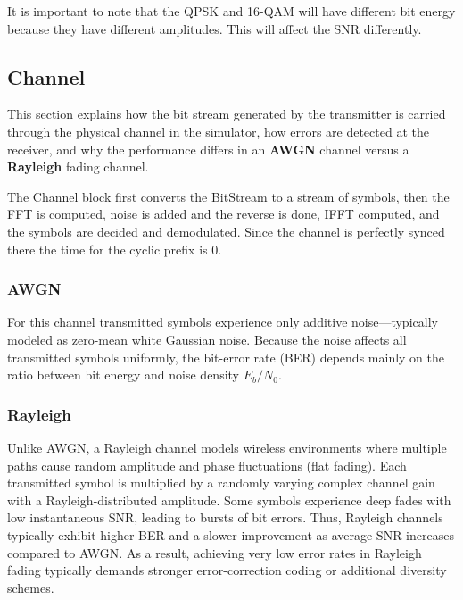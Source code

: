 It is important to note that the QPSK and 16-QAM will have different bit energy because they have different amplitudes. This will affect the SNR differently.


\subsection{Channel}

\label{sec:channel}

This section explains how the bit stream generated by the transmitter is carried through the physical channel in the simulator, how errors are detected at the receiver, and why the performance differs in an \textbf{AWGN} channel versus a \textbf{Rayleigh} fading channel.

The Channel block first converts the BitStream to a stream of symbols, then the FFT is computed, noise is added and the reverse is done, IFFT computed, and the symbols are decided and demodulated. Since the channel is perfectly synced there the time for the cyclic prefix is 0.

\subsubsection{AWGN}

For this channel transmitted symbols experience only additive noise—typically modeled as zero-mean white Gaussian noise. Because the noise affects all transmitted symbols uniformly, the bit-error rate (BER) depends mainly on the ratio between bit energy and noise density $E_b/N_{0}$. 

\subsubsection{Rayleigh}

Unlike AWGN, a Rayleigh channel models wireless environments where multiple paths cause random amplitude and phase fluctuations (flat fading). Each transmitted symbol is multiplied by a randomly varying complex channel gain with a Rayleigh-distributed amplitude. Some symbols experience deep fades with low instantaneous SNR, leading to bursts of bit errors. Thus, Rayleigh channels typically exhibit higher BER and a slower improvement as average SNR increases compared to AWGN. As a result, achieving very low error rates in Rayleigh fading typically demands stronger error-correction coding or additional diversity schemes.


